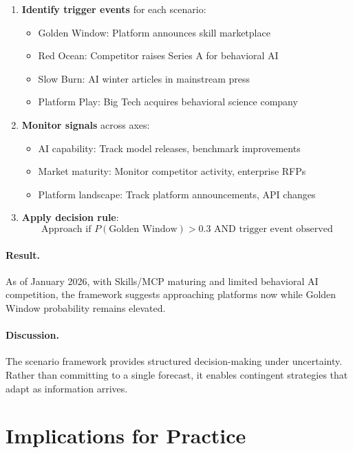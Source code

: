 \begin{enumerate}
\item \textbf{Identify trigger events} for each scenario:
    \begin{itemize}
    \item Golden Window: Platform announces skill marketplace
    \item Red Ocean: Competitor raises Series A for behavioral AI
    \item Slow Burn: AI winter articles in mainstream press
    \item Platform Play: Big Tech acquires behavioral science company
    \end{itemize}

\item \textbf{Monitor signals} across axes:
    \begin{itemize}
    \item AI capability: Track model releases, benchmark improvements
    \item Market maturity: Monitor competitor activity, enterprise RFPs
    \item Platform landscape: Track platform announcements, API changes
    \end{itemize}

\item \textbf{Apply decision rule}:
\begin{equation}
\text{Approach if } P(\text{Golden Window}) > 0.3 \text{ AND trigger event observed}
\end{equation}
\end{enumerate}

\paragraph{Result.}
As of January 2026, with Skills/MCP maturing and limited behavioral AI
competition, the framework suggests approaching platforms now while
Golden Window probability remains elevated.

\paragraph{Discussion.}
The scenario framework provides structured decision-making under uncertainty.
Rather than committing to a single forecast, it enables contingent strategies
that adapt as information arrives.


\section{Implications for Practice}
\label{sec:vvv1-practice}

